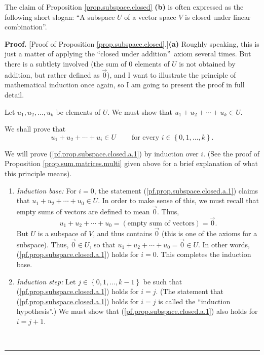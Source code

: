 \documentclass[numbers=enddot,12pt,final,onecolumn,notitlepage]{scrartcl}%
\theoremstyle{definition}
\newenvironment{proof}[1][Proof]{\noindent\textbf{#1.} }{\ \rule{0.5em}{0.5em}}
\begin{document}
The claim of Proposition \ref{prop.subspace.closed} \textbf{(b)} is often
expressed as the following short slogan: \textquotedblleft A subspace $U$ of a
vector space $V$ is closed under linear combination\textquotedblright.

\begin{proof}
[Proof of Proposition \ref{prop.subspace.closed}.]\textbf{(a)} Roughly
speaking, this is just a matter of applying the \textquotedblleft closed under
addition\textquotedblright\ axiom several times. But there is a subtlety
involved (the sum of $0$ elements of $U$ is not obtained by addition, but
rather defined as $\overrightarrow{0}$), and I want to illustrate the
principle of mathematical induction once again, so I am going to present the
proof in full detail.

Let $u_{1},u_{2},\ldots,u_{k}$ be elements of $U$. We must show that
$u_{1}+u_{2}+\cdots+u_{k}\in U$.

We shall prove that%
\begin{equation}
u_{1}+u_{2}+\cdots+u_{i}\in U\ \ \ \ \ \ \ \ \ \ \text{for every }i\in\left\{
0,1,\ldots,k\right\}  . \label{pf.prop.subspace.closed.a.1}%
\end{equation}


We will prove (\ref{pf.prop.subspace.closed.a.1}) by induction over $i$. (See
the proof of Proposition \ref{prop.sum.matrices.multi} given above for a brief
explanation of what this principle means).

\begin{enumerate}
\item \textit{Induction base:} For $i=0$, the statement
(\ref{pf.prop.subspace.closed.a.1}) claims that $u_{1}+u_{2}+\cdots+u_{0}\in
U$. In order to make sense of this, we must recall that empty sums of vectors
are defined to mean $\overrightarrow{0}$. Thus,
\[
u_{1}+u_{2}+\cdots+u_{0}=\left(  \text{empty sum of vectors}\right)
=\overrightarrow{0}.
\]
But $U$ is a subspace of $V$, and thus contains $\overrightarrow{0}$ (this is
one of the axioms for a subspace). Thus, $\overrightarrow{0}\in U$, so that
$u_{1}+u_{2}+\cdots+u_{0}=\overrightarrow{0}\in U$. In other words,
(\ref{pf.prop.subspace.closed.a.1}) holds for $i=0$. This completes the
induction base.

\item \textit{Induction step:} Let $j\in\left\{  0,1,\ldots,k-1\right\}  $ be
such that (\ref{pf.prop.subspace.closed.a.1}) holds for $i=j$. (The statement
that (\ref{pf.prop.subspace.closed.a.1}) holds for $i=j$ is called the
\textquotedblleft induction hypothesis\textquotedblright.) We must show that
(\ref{pf.prop.subspace.closed.a.1}) also holds for $i=j+1$.


\end{enumerate}
\end{proof}
\end{document}
